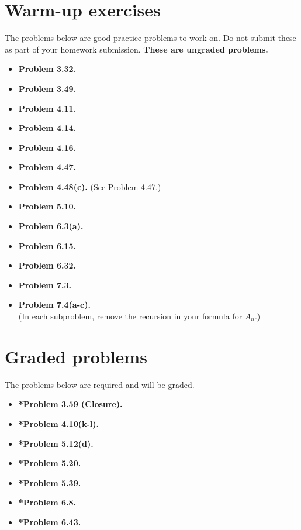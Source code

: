 \documentclass[11pt]{article}
\begin{document}
\vspace{0.2in}
\newpage
\section*{Warm-up exercises}
The problems below are good practice problems to work on.
Do not submit these as part of your homework submission.
\textbf{These are ungraded problems.}

\begin{multicols}{2}
\begin{itemize}

\item \textbf{Problem 3.32.}
\item \textbf{Problem 3.49.}
\item \textbf{Problem 4.11.}
\item \textbf{Problem 4.14.}
\item \textbf{Problem 4.16.}
\item \textbf{Problem 4.47.}
\item \textbf{Problem 4.48(c).} (See Problem 4.47.)
\item \textbf{Problem 5.10.}
\item \textbf{Problem 6.3(a).}
\item \textbf{Problem 6.15.}
\item \textbf{Problem 6.32.}
\item \textbf{Problem 7.3.}
\item \textbf{Problem 7.4(a-c).} \\
(In each subproblem, remove the recursion in your formula for $A_n$.)

\end{itemize}
\end{multicols}

\section*{Graded problems}
The problems below are required and will be graded.
\begin{itemize}

\item \textbf{*Problem 3.59 (Closure).}
\item \textbf{*Problem 4.10(k-l).}
\item \textbf{*Problem 5.12(d).}
\item \textbf{*Problem 5.20.}
\item \textbf{*Problem 5.39.}
\item \textbf{*Problem 6.8.}
\item \textbf{*Problem 6.43.}

\end{itemize}
\end{document}
